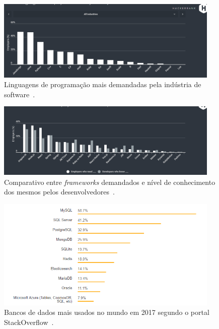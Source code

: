 \begin{figure}[htp]
    \centering
    \includegraphics[width=0.95\textwidth]{figuras/figura002.png}
    \caption{Linguagens de programação mais demandadas pela indústria de software~\cite{linguagemEframework}.}
    \label{Figura002}
\end{figure}

\begin{figure}[htp]
    \centering
    \includegraphics[width=0.95\textwidth]{figuras/figura003.png}
    \caption{Comparativo entre \textit{frameworks} demandados e nível de conhecimento dos mesmos pelos desenvolvedores~\cite{linguagemEframework}.}
    \label{Figura003}
\end{figure}

\begin{figure}[H]
    \centering
    \includegraphics[width=0.95\textwidth]{figuras/figura004.png}
    \caption{Bancos de dados mais usados no mundo em 2017 segundo o portal StackOverflow~\cite{bancomaisusado}.}
    \label{Figura004}
\end{figure}

